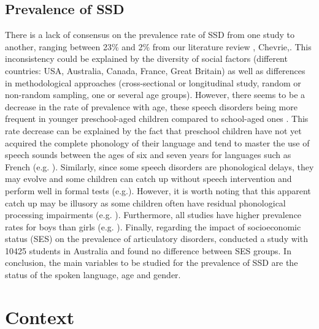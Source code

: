 \documentclass[output=paper,newtxmath,modfonts,nonflat,draftmode]{langsci/langscibook}
\begin{document}
\subsection{Prevalence of SSD}  %

There is a lack of consensus on the prevalence rate of SSD from one study to another, ranging between 23\% and 2\% from our literature review \cite{McKinnon2007, Shriberg1999, Fombonne1997, Beitchman1986, Enderby1986, Kirkpatrick1984, Silva1984, Silva1980, Peckham1973, Stevenson1976, Morley1972, Hull1971}, Chevrie,. This inconsistency could be explained by the diversity of social factors (different countries: USA, Australia, Canada, France, Great Britain) as well as differences in methodological approaches (cross-sectional or longitudinal study, random or non-random sampling, one or several age groups). However, there seems to be a decrease in the rate of prevalence with age, these speech disorders being more frequent in younger preschool-aged children compared to school-aged ones \citep{Morley1972}. This rate decrease can be explained by the fact that preschool children have not yet acquired the complete phonology of their language and tend to master the use of speech sounds between the ages of six and seven years for languages such as French (e.g. \citealt{Rvachew2013}). Similarly, since some speech disorders are phonological delays, they may evolve and some children can catch up without speech intervention and perform well in formal tests (e.g.\citealt{BishopEdmundson1987}). However, it is worth noting that this apparent catch up may be illusory as some children often have residual phonological processing impairments (e.g. \citealt{Stothard1998}). Furthermore, all studies have higher prevalence rates for boys than girls (e.g. \citealt{Shriberg1999}). Finally, regarding the impact of socioeconomic status (SES) on the prevalence of articulatory disorders, \citet{McKinnon2007} conducted a study with 10425 students in Australia and found no difference between SES groups. In conclusion, the main variables to be studied for the prevalence of SSD are the status of the spoken language, age and gender.

\section{Context} %
\end{document}
